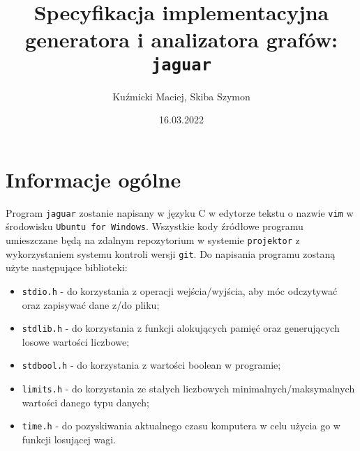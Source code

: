 \documentclass[]{article}
\title{Specyfikacja implementacyjna generatora i analizatora grafów: \texttt{jaguar}}
\author{Kuźmicki Maciej, Skiba Szymon}
\date{16.03.2022}
\begin{document}
\maketitle
\thispagestyle{fancy}
\section{Informacje ogólne}\label{header-n231}
Program \texttt{jaguar} zostanie napisany w języku C w edytorze tekstu o nazwie \texttt{vim} w środowisku \texttt{Ubuntu for Windows}. Wszystkie kody źródłowe programu umieszczane będą na zdalnym repozytorium w systemie \texttt{projektor} z wykorzystaniem systemu kontroli wersji \texttt{git}. Do napisania programu zostaną użyte następujące biblioteki:
\begin{itemize}
\item
\texttt{stdio.h} - do korzystania z operacji wejścia/wyjścia, aby móc odczytywać oraz zapisywać dane z/do pliku;
\item
\texttt{stdlib.h} - do korzystania z funkcji alokujących pamięć oraz generujących losowe wartości liczbowe;
\item
\texttt{stdbool.h} - do korzystania z wartości boolean w programie;
\item
\texttt{limits.h} - do korzystania ze stałych liczbowych minimalnych/maksymalnych wartości danego typu danych;
\item
\texttt{time.h} - do pozyskiwania aktualnego czasu komputera w celu użycia go w funkcji losującej wagi.
\end{itemize}
\end{document}

